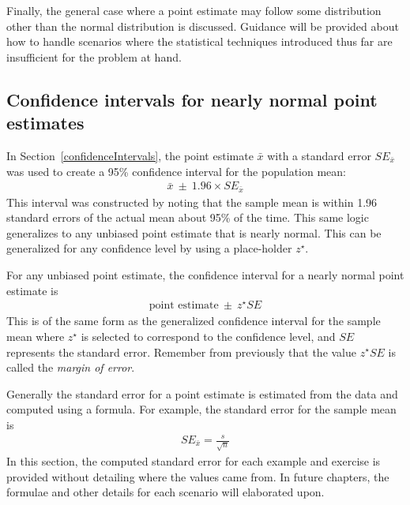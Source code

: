 Finally, the general case where a point estimate may follow some distribution other than the normal distribution is discussed. Guidance will be provided about how to handle scenarios where the statistical techniques introduced thus far are insufficient for the problem at hand.

\subsection{Confidence intervals for nearly normal point estimates}


In Section~\ref{confidenceIntervals}, the point estimate $\bar{x}$ with a standard error $SE_{\bar{x}}$ was used to create a 95\% confidence interval for the population mean:
\begin{align}
\bar{x}\ \pm\ 1.96 \times SE_{\bar{x}}
\label{95PercCIForMeanInGeneralizingSection}
\end{align}
This interval was constructed by noting that the sample mean is within 1.96 standard errors of the actual mean about 95\% of the time. This same logic generalizes to any unbiased point estimate that is nearly normal. This can be generalized for any confidence level by using a place-holder $z^{\star}$.

\begin{termBox}{\label{generalConfidenceIntervalTermBox}%
For any unbiased point estimate, the confidence interval for a nearly normal point estimate is
\begin{eqnarray}
\text{point estimate}\ \pm\ z^{\star}SE
\label{95PercGeneralCIInGeneralizingSection}
\end{eqnarray}
This is of the same form as the generalized confidence interval for the sample mean where $z^{\star}$ is selected to correspond to the confidence level, and $SE$ represents the standard error. Remember from previously that the value $z^{\star}SE$ is called the \emph{margin of error}.}
\end{termBox}

Generally the standard error for a point estimate is estimated from the data and computed using a formula. For example, the standard error for the sample mean is
\begin{eqnarray*}
SE_{\bar{x}} = \frac{s}{\sqrt{n}}
\end{eqnarray*}
In this section, the computed standard error for each example and exercise is provided without detailing where the values came from. In future chapters, the formulae and other details for each scenario will elaborated upon.

